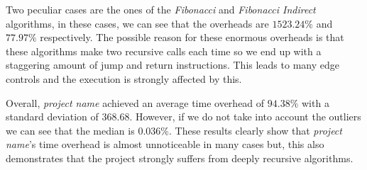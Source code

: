 Two peculiar cases are the ones of the \textit{Fibonacci} and \textit{Fibonacci
Indirect} algorithms, in these cases, we can see that the overheads are $1523.24\%$
and $77.97\%$ respectively. The possible reason for these enormous overheads is
that these algorithms make two recursive calls each time so we end up with a
staggering amount of jump and return instructions. This leads to many edge controls
and the execution is strongly affected by this.

Overall, \textit{project name} achieved an average time overhead of $94.38\%$ with
a standard deviation of $368.68$. However, if we do not take into account the outliers
we can see that the median is $0.036\%$. These results clearly show that \textit{project
name}'s time overhead is almost unnoticeable in many cases but, this also
demonstrates that the project strongly suffers from deeply recursive algorithms.

